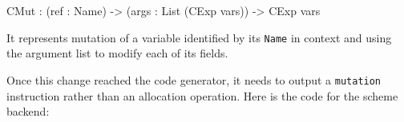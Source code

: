 \documentclass[
]{article}
\newenvironment{Shaded}{}{}
\newcommand{\DataTypeTok}[1]{\textcolor[rgb]{0.56,0.13,0.00}{#1}}
\newcommand{\NormalTok}[1]{#1}
\newcommand{\OperatorTok}[1]{\textcolor[rgb]{0.40,0.40,0.40}{#1}}
\newcommand{\OtherTok}[1]{\textcolor[rgb]{0.00,0.44,0.13}{#1}}
\begin{document}
\begin{Shaded}
\begin{Highlighting}[]
\DataTypeTok{CMut} \OperatorTok{:}\NormalTok{ (ref }\OperatorTok{:} \DataTypeTok{Name}\NormalTok{) }\OtherTok{{-}\textgreater{}}\NormalTok{ (args }\OperatorTok{:} \DataTypeTok{List}\NormalTok{ (}\DataTypeTok{CExp}\NormalTok{ vars)) }\OtherTok{{-}\textgreater{}} \DataTypeTok{CExp}\NormalTok{ vars }
\end{Highlighting}
\end{Shaded}

It represents mutation of a variable identified by its \texttt{Name} in
context and using the argument list to modify each of its fields.

Once this change reached the code generator, it needs to output a
\texttt{mutation} instruction rather than an allocation operation. Here
is the code for the scheme backend:
\end{document}
